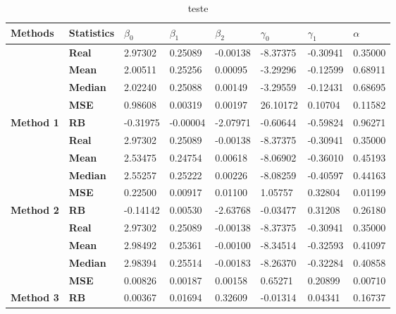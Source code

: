 \begin{table}

\caption{\label{tab:sadf}teste}
\centering
\begin{tabular}[t]{>{}l>{}lllllll}
\toprule
Methods & Statistics & $\beta_0$ & $\beta_1$ & $\beta_2$ & $\gamma_0$ & $\gamma_1$ & $\alpha$\\
\midrule
 & \textbf{Real} & 2.97302 & 0.25089 & -0.00138 & -8.37375 & -0.30941 & 0.35000\\
\cmidrule{2-8}
 & \textbf{Mean} & 2.00511 & 0.25256 & 0.00095 & -3.29296 & -0.12599 & 0.68911\\
\cmidrule{2-8}
 & \textbf{Median} & 2.02240 & 0.25088 & 0.00149 & -3.29559 & -0.12431 & 0.68695\\
\cmidrule{2-8}
 & \textbf{MSE} & 0.98608 & 0.00319 & 0.00197 & 26.10172 & 0.10704 & 0.11582\\
\cmidrule{2-8}
\multirow{-5}{*}{\raggedright\arraybackslash \textbf{Method 1}} & \textbf{RB} & -0.31975 & -0.00004 & -2.07971 & -0.60644 & -0.59824 & 0.96271\\
\cmidrule{1-8}
 & \textbf{Real} & 2.97302 & 0.25089 & -0.00138 & -8.37375 & -0.30941 & 0.35000\\
\cmidrule{2-8}
 & \textbf{Mean} & 2.53475 & 0.24754 & 0.00618 & -8.06902 & -0.36010 & 0.45193\\
\cmidrule{2-8}
 & \textbf{Median} & 2.55257 & 0.25222 & 0.00226 & -8.08259 & -0.40597 & 0.44163\\
\cmidrule{2-8}
 & \textbf{MSE} & 0.22500 & 0.00917 & 0.01100 & 1.05757 & 0.32804 & 0.01199\\
\cmidrule{2-8}
\multirow{-5}{*}{\raggedright\arraybackslash \textbf{Method 2}} & \textbf{RB} & -0.14142 & 0.00530 & -2.63768 & -0.03477 & 0.31208 & 0.26180\\
\cmidrule{1-8}
 & \textbf{Real} & 2.97302 & 0.25089 & -0.00138 & -8.37375 & -0.30941 & 0.35000\\
\cmidrule{2-8}
 & \textbf{Mean} & 2.98492 & 0.25361 & -0.00100 & -8.34514 & -0.32593 & 0.41097\\
\cmidrule{2-8}
 & \textbf{Median} & 2.98394 & 0.25514 & -0.00183 & -8.26370 & -0.32284 & 0.40858\\
\cmidrule{2-8}
 & \textbf{MSE} & 0.00826 & 0.00187 & 0.00158 & 0.65271 & 0.20899 & 0.00710\\
\cmidrule{2-8}
\multirow{-5}{*}{\raggedright\arraybackslash \textbf{Method 3}} & \textbf{RB} & 0.00367 & 0.01694 & 0.32609 & -0.01314 & 0.04341 & 0.16737\\
\bottomrule
\end{tabular}
\end{table}
